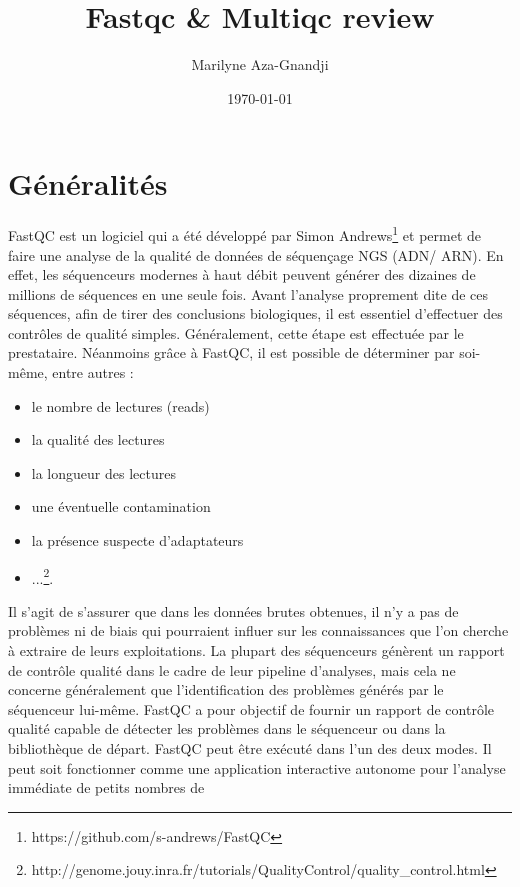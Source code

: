 \documentclass[a4paper,11pt]{article}
\begin{document}
\title{Fastqc \& Multiqc review} \author{Marilyne Aza-Gnandji}
\date{\today}

\maketitle \tableofcontents

\section{Généralités}

FastQC est un logiciel qui a été développé par Simon
Andrews\footnote{{https://github.com/s-andrews/FastQC}} et permet de
faire une analyse de la qualité de données de séquençage NGS (ADN/
ARN). En effet, les séquenceurs modernes à haut débit peuvent générer
des dizaines de millions de séquences en une seule fois.  Avant
l'analyse proprement dite de ces séquences, afin de tirer des
conclusions biologiques, il est essentiel d'effectuer des contrôles de
qualité simples. Généralement, cette étape est effectuée par le
prestataire. Néanmoins grâce à FastQC, il est possible de déterminer
par soi-même, entre autres :
\begin{itemize}
  \item[\textbullet] le nombre de lectures (reads)
   \item[\textbullet] la qualité des lectures
    \item[\textbullet] la longueur des lectures
     \item[\textbullet] une éventuelle contamination
     \item[\textbullet] la présence suspecte d'adaptateurs
       \item[\textbullet]
         ...\footnote{{http://genome.jouy.inra.fr/tutorials/QualityControl/quality_control.html}}.
\end{itemize}
Il s'agit de s'assurer que dans les données brutes obtenues, il n'y a
pas de problèmes ni de biais qui pourraient influer sur les
connaissances que l'on cherche à extraire de leurs exploitations. La
plupart des séquenceurs génèrent un rapport de contrôle qualité dans
le cadre de leur pipeline d’analyses, mais cela ne concerne
généralement que l’identification des problèmes générés par le
séquenceur lui-même.  FastQC a pour objectif de fournir un rapport de
contrôle qualité capable de détecter les problèmes dans le séquenceur
ou dans la bibliothèque de départ. FastQC peut être exécuté dans l'un
des deux modes. Il peut soit fonctionner comme une application
interactive autonome pour l’analyse immédiate de petits nombres de
\end{document}
